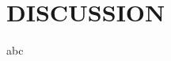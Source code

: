 \documentclass[utf8]{frontiersSCNS} %
\begin{document}
\section{DISCUSSION}
abc








\end{document}
